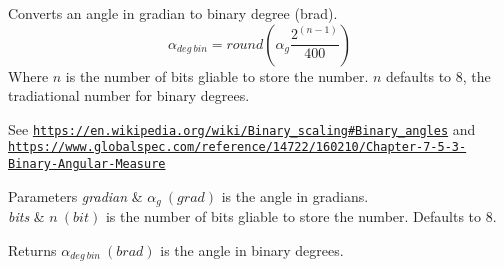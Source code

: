 Converts an angle in gradian to binary degree (brad). \[\alpha_{deg\ bin}=round(\alpha_{g}\frac{2^{(n-1)}}{400})\] Where $n$ is the number of bits gliable to store the number. $n$ defaults to 8, the tradiational number for binary degrees. 

See \href{https://en.wikipedia.org/wiki/Binary_scaling#Binary_angles}{\tt https\+://en.\+wikipedia.\+org/wiki/\+Binary\+\_\+scaling\#\+Binary\+\_\+angles} and \href{https://www.globalspec.com/reference/14722/160210/Chapter-7-5-3-Binary-Angular-Measure}{\tt https\+://www.\+globalspec.\+com/reference/14722/160210/\+Chapter-\/7-\/5-\/3-\/\+Binary-\/\+Angular-\/\+Measure} 
\begin{DoxyParams}{Parameters}
{\em gradian} & $\alpha_{g}\ (grad)$ is the angle in gradians. \\
\hline
{\em bits} & $n\ (bit)$ is the number of bits gliable to store the number. Defaults to 8. \\
\hline
\end{DoxyParams}
\begin{DoxyReturn}{Returns}
$\alpha_{deg\ bin}\ (brad)$ is the angle in binary degrees. 
\end{DoxyReturn}
